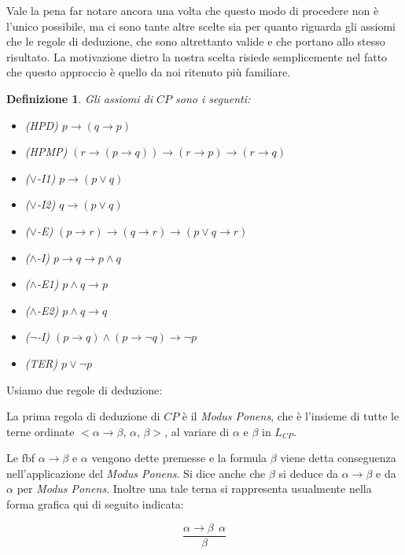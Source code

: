 \documentclass[a4paper, titlepage, 12pt]{report}
\newtheorem{definition}{Definizione}[chapter]
\begin{document}
Vale la pena far notare ancora una volta che questo modo di procedere non è l'unico
possibile, ma ci sono tante altre scelte sia
per quanto riguarda gli assiomi che le regole di deduzione, che sono altrettanto valide
e che portano allo stesso risultato. La motivazione dietro la nostra scelta
risiede semplicemente nel fatto che questo approccio è quello da noi ritenuto più familiare.

\begin{definition}
Gli assiomi di $CP$ sono i seguenti:
\begin{itemize}
\item (HPD) $p \rightarrow (q \rightarrow p)$
\item (HPMP) $(r \rightarrow (p \rightarrow q)) \rightarrow (r \rightarrow p) \rightarrow (r \rightarrow q)$
\item ($\lor$-I1) $p \rightarrow (p \lor q)$
\item ($\lor$-I2) $q \rightarrow (p \lor q)$
\item ($\lor$-E) $(p \rightarrow r) \rightarrow (q \rightarrow r) \rightarrow (p \lor q \rightarrow r)$
\item ($\land$-I) $p \rightarrow q \rightarrow p \land q$
\item ($\land$-E1) $p \land q \rightarrow p$
\item ($\land$-E2) $p \land q \rightarrow q$
\item ($\neg$-I) $(p \rightarrow q) \land (p \rightarrow \neg q) \rightarrow \neg p$
\item (TER) $p \lor \neg p$
\end{itemize}
\end{definition}

Usiamo due regole di deduzione:

La prima regola di deduzione di $CP$ è il \emph{Modus Ponens}, che è l'insieme
di tutte le terne ordinate $<\alpha \rightarrow \beta$, $\alpha$, $\beta>$,
al variare di $\alpha$ e $\beta$ in $L_{CP}$.

Le fbf $\alpha \rightarrow \beta$ e $\alpha$ vengono dette premesse e la formula $\beta$
viene detta conseguenza nell'applicazione del \emph{Modus Ponens}.
Si dice anche che $\beta$ si deduce da $\alpha \rightarrow \beta$ e da $\alpha$
per \emph{Modus Ponens}.
Inoltre una tale terna si rappresenta usualmente nella forma grafica qui di seguito indicata:

$$\frac{\alpha \rightarrow \beta \ \ \alpha}{\beta}$$
\end{document}
